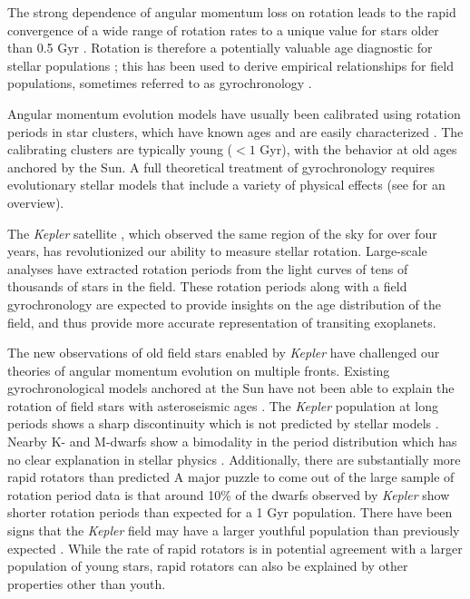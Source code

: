 \documentclass[manuscript]{aastex6}
\newcommand{\Kepler}{\mbox{\textit{Kepler}}}
\begin{document}
The strong dependence of angular momentum loss on rotation \citep{Kawaler88}
leads to the rapid convergence of a wide range of rotation rates to a unique
value for stars older than 0.5 Gyr \citep{Pinsonneault89}. Rotation is
therefore a potentially valuable age diagnostic for stellar populations
\citep{Skumanich72}; this has been used to derive empirical relationships for
field populations, sometimes referred to as gyrochronology \citep{Barnes07,
Mamajek08, Meibom09}.  

Angular momentum evolution models have usually been calibrated using rotation periods in
star clusters, which have known ages and are easily characterized
\citep{Krishnamurthi97, Gallet13, Somers17}. The calibrating clusters are typically
young (\(< 1\) Gyr), with the behavior at old ages anchored by the Sun. A full 
theoretical treatment of gyrochronology requires evolutionary stellar models 
that include a variety of physical effects (see \citet{Gallet13} for an
overview).

The \Kepler{} satellite \citep{Borucki10,Koch10}, which observed the same
region of the sky for over four years, has revolutionized our ability to
measure stellar rotation. Large-scale analyses have extracted rotation periods
from the light curves of tens of thousands of stars \citep{Nielsen13,
Reinhold13, Garcia14, McQuillan14} in the field. These rotation periods along 
with a field gyrochronology are expected to provide insights on the age 
distribution of the field, and thus provide more accurate representation of 
transiting exoplanets.

The new observations of old field stars enabled by \Kepler{} have challenged 
our theories of angular momentum evolution on multiple fronts. Existing 
gyrochronological models anchored at the Sun have not been able to explain
the rotation of field stars with asteroseismic ages \citep{Angus15, 
VanSaders16}. The \Kepler{} population at long periods shows a sharp
discontinuity which is not predicted by stellar models \citep{VanSaders18}. 
Nearby K- and M-dwarfs show a bimodality in the period distribution which has
no clear explanation in stellar physics \citep{Davenport18}. Additionally,
there are substantially more rapid rotators than predicted
A major puzzle to come out of the large sample of rotation period data is that
around 10\% of the dwarfs observed by \Kepler{} show shorter rotation periods 
than expected for a 1 Gyr population. There have been signs that the
\Kepler{} field may have a larger youthful population than previously expected
\citep{Berger18a}. While the rate of rapid rotators is in potential agreement
with a larger population of young stars, rapid rotators can also be explained
by other properties other than youth.
\end{document}
